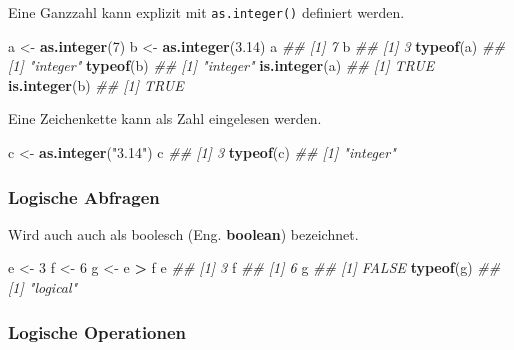 \documentclass[]{book}
\newenvironment{Shaded}{\begin{snugshade}}{\end{snugshade}}
\newcommand{\CommentTok}[1]{\textcolor[rgb]{0.56,0.35,0.01}{\textit{#1}}}
\newcommand{\DecValTok}[1]{\textcolor[rgb]{0.00,0.00,0.81}{#1}}
\newcommand{\FloatTok}[1]{\textcolor[rgb]{0.00,0.00,0.81}{#1}}
\newcommand{\KeywordTok}[1]{\textcolor[rgb]{0.13,0.29,0.53}{\textbf{#1}}}
\newcommand{\NormalTok}[1]{#1}
\newcommand{\OperatorTok}[1]{\textcolor[rgb]{0.81,0.36,0.00}{\textbf{#1}}}
\newcommand{\StringTok}[1]{\textcolor[rgb]{0.31,0.60,0.02}{#1}}
\begin{document}
Eine Ganzzahl kann explizit mit \texttt{as.integer()} definiert werden.

\begin{Shaded}
\begin{Highlighting}[]
\NormalTok{a <-}\StringTok{ }\KeywordTok{as.integer}\NormalTok{(}\DecValTok{7}\NormalTok{)}
\NormalTok{b <-}\StringTok{ }\KeywordTok{as.integer}\NormalTok{(}\FloatTok{3.14}\NormalTok{)}
\NormalTok{a}
\CommentTok{## [1] 7}
\NormalTok{b}
\CommentTok{## [1] 3}
\KeywordTok{typeof}\NormalTok{(a)}
\CommentTok{## [1] "integer"}
\KeywordTok{typeof}\NormalTok{(b)}
\CommentTok{## [1] "integer"}
\KeywordTok{is.integer}\NormalTok{(a)}
\CommentTok{## [1] TRUE}
\KeywordTok{is.integer}\NormalTok{(b)}
\CommentTok{## [1] TRUE}
\end{Highlighting}
\end{Shaded}

Eine Zeichenkette kann als Zahl eingelesen werden.

\begin{Shaded}
\begin{Highlighting}[]
\NormalTok{c <-}\StringTok{ }\KeywordTok{as.integer}\NormalTok{(}\StringTok{"3.14"}\NormalTok{)}
\NormalTok{c}
\CommentTok{## [1] 3}
\KeywordTok{typeof}\NormalTok{(c)}
\CommentTok{## [1] "integer"}
\end{Highlighting}
\end{Shaded}

\hypertarget{logische-abfragen}{%
\subsubsection{Logische Abfragen}\label{logische-abfragen}}

Wird auch auch als boolesch (Eng. \textbf{boolean}) bezeichnet.

\begin{Shaded}
\begin{Highlighting}[]
\NormalTok{e <-}\StringTok{ }\DecValTok{3}
\NormalTok{f <-}\StringTok{ }\DecValTok{6}
\NormalTok{g <-}\StringTok{ }\NormalTok{e }\OperatorTok{>}\StringTok{ }\NormalTok{f}
\NormalTok{e}
\CommentTok{## [1] 3}
\NormalTok{f}
\CommentTok{## [1] 6}
\NormalTok{g}
\CommentTok{## [1] FALSE}
\KeywordTok{typeof}\NormalTok{(g)}
\CommentTok{## [1] "logical"}
\end{Highlighting}
\end{Shaded}

\hypertarget{logische-operationen}{%
\subsubsection{Logische Operationen}\label{logische-operationen}}
\end{document}
